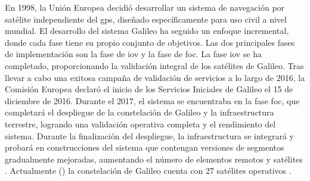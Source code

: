 \begin{justify}
    En 1998, la Unión Europea decidió desarrollar un sistema de navegación por satélite independiente del \gls{gps}, diseñado específicamente
    para uso civil a nivel mundial. El desarrollo del sistema Galileo ha seguido un enfoque incremental, donde cada fase tiene su propio conjunto de objetivos. Las dos principales
    fases de implementación son la fase de \gls{iov} y la fase de \gls{foc}. La fase \gls{iov} se ha completado, proporcionando la validación
    integral de los satélites de Galileo. Tras llevar a cabo una exitosa campaña de validación de servicios a lo largo de 2016, la Comisión
    Europea declaró el inicio de los Servicios Iniciales de Galileo el 15 de diciembre de 2016. Durante el 2017, el sistema se encuentraba en la fase \gls{foc}, que completará el
    despliegue de la constelación de Galileo y la infraestructura terrestre, logrando una validación operativa completa y el rendimiento del sistema. Durante la finalización
    del despliegue, la infraestructura se integrará y probará en construcciones del sistema que contengan versiones de segmentos gradualmente mejoradas, aumentando el número
    de elementos remotos y satélites \parencite{kaplan2017understanding}. Actualmente () la constelación de Galileo cuenta con 27 satélites
    operativos \parencite{gsc_europa}.
\end{justify}